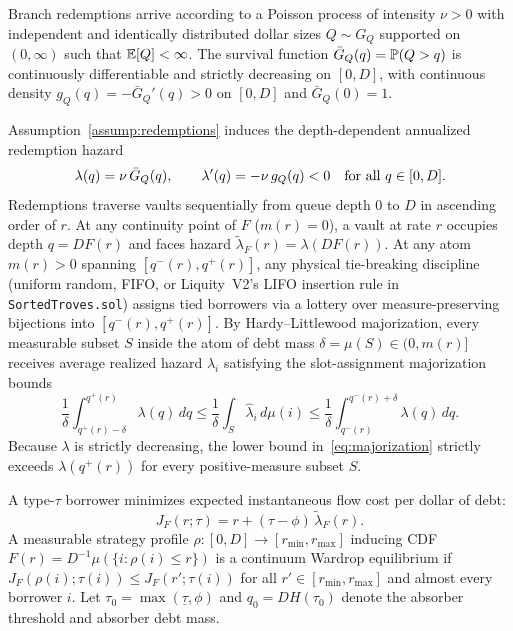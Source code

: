 \begin{assumption}\label{assump:redemptions}
Branch redemptions arrive according to a Poisson process of intensity $\nu > 0$ with independent and identically distributed dollar sizes $Q \sim G_Q$ supported on $(0, \infty)$ such that $\mathbb{E}[Q] < \infty$. The survival function $\bar{G}_Q(q) = \mathbb{P}(Q > q)$ is continuously differentiable and strictly decreasing on $[0, D]$, with continuous density $g_Q(q) = -\bar{G}_Q'(q) > 0$ on $[0, D]$ and $\bar{G}_Q(0) = 1$.
\end{assumption}

Assumption~\ref{assump:redemptions} induces the depth-dependent annualized redemption hazard
\begin{equation}\label{eq:hazard}
\lambda(q) = \nu\,\bar{G}_Q(q), \qquad \lambda'(q) = -\nu\,g_Q(q) < 0 \quad \textup{for all } q \in [0, D].
\end{equation}
Redemptions traverse vaults sequentially from queue depth $0$ to $D$ in ascending order of $r$. At any continuity point of $F$ ($m(r) = 0$), a vault at rate $r$ occupies depth $q = D F(r)$ and faces hazard $\tilde{\lambda}_F(r) = \lambda(D F(r))$. At any atom $m(r) > 0$ spanning $[q^-(r), q^+(r)]$, any physical tie-breaking discipline (uniform random, FIFO, or Liquity~V2's LIFO insertion rule in \texttt{SortedTroves.sol}) assigns tied borrowers via a lottery over measure-preserving bijections into $[q^-(r), q^+(r)]$. By Hardy--Littlewood majorization, every measurable subset $S$ inside the atom of debt mass $\delta = \mu(S) \in (0, m(r)]$ receives average realized hazard $\hat{\lambda}_i$ satisfying the slot-assignment majorization bounds
\begin{equation}\label{eq:majorization}
\frac{1}{\delta}\int_{q^+(r)-\delta}^{q^+(r)} \lambda(q)\,dq \le \frac{1}{\delta}\int_S \hat{\lambda}_i\,d\mu(i) \le \frac{1}{\delta}\int_{q^-(r)}^{q^-(r)+\delta} \lambda(q)\,dq.
\end{equation}
Because $\lambda$ is strictly decreasing, the lower bound in~\eqref{eq:majorization} strictly exceeds $\lambda(q^+(r))$ for every positive-measure subset $S$.

A type-$\tau$ borrower minimizes expected instantaneous flow cost per dollar of debt:
\begin{equation}\label{eq:flow_cost}
J_F(r; \tau) = r + (\tau - \phi)\,\tilde{\lambda}_F(r).
\end{equation}
A measurable strategy profile $\rho : [0, D] \to [r_{\min}, r_{\max}]$ inducing CDF $F(r) = D^{-1}\mu(\{i : \rho(i) \le r\})$ is a continuum Wardrop equilibrium if $J_F(\rho(i); \tau(i)) \le J_F(r'; \tau(i))$ for all $r' \in [r_{\min}, r_{\max}]$ and almost every borrower $i$. Let $\tau_0 = \max(\underline{\tau}, \phi)$ and $q_0 = D H(\tau_0)$ denote the absorber threshold and absorber debt mass.

